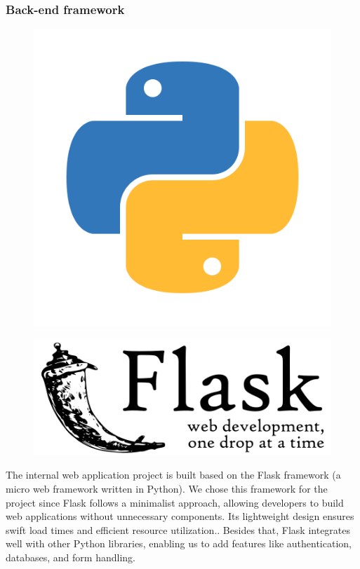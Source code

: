     \subsubsection{Back-end framework}
    \begin{figure}[H]
        \centering
        \begin{minipage}{.5\textwidth}
          \centering
          \includegraphics[width=.25\linewidth]{graphics/python-logo.png}
          \label{fig:python}
        \end{minipage}%
        \begin{minipage}{.5\textwidth}
          \centering
          \includegraphics[width=.65\linewidth]{graphics/flask-logo.png}
          \label{fig:flask}
        \end{minipage}
    \end{figure}

    The internal web application project is built based on the Flask framework (a micro web framework written in Python). We chose this framework for the project since Flask follows a minimalist approach, allowing developers to build web applications without unnecessary components. Its lightweight design ensures swift load times and efficient resource utilization.\cite{why_flask}. Besides that, Flask integrates well with other Python libraries, enabling us to add features like authentication, databases, and form handling.


